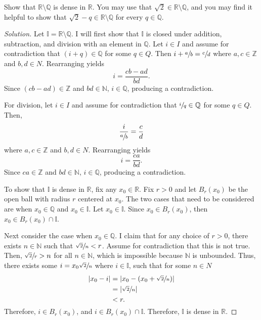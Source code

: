 \documentclass[11pt,letterpaper]{article}
\newcommand{\N}{\mathbb{N}}
\newcommand{\Q}{\mathbb{Q}}
\newcommand{\R}{\mathbb{R}}
\newcommand{\Z}{\mathbb{Z}}
\newcommand{\I}{\mathbb{I}}
\newenvironment{prob}[1]
  {\renewcommand\theinnerprob{#1}\innerprob}
  {\endinnerprob}
\newenvironment{solution}
  {\renewcommand\qedsymbol{}\begin{proof}[Solution]}
  {\end{proof}\bigskip}
\begin{document}
\begin{prob}{6} %
Show that $\R\setminus \Q$ is dense in $\R$.  You may use that $\sqrt 2 \in \R\setminus \Q$, and you may find it helpful to show that $\sqrt 2 -q \in \R\setminus \Q$ for every $q\in\Q$.
\end{prob}
\begin{solution}
	Let $\I = \R\setminus \Q$. I will first show that $\I$ is closed under addition, subtraction, and division with an element in $\Q$. Let $i\in I$ and assume for contradiction that $(i + q)\in \Q$ for some $q\in Q$. Then $i + \sfrac{a}{b} = \sfrac{c}{d}$ where $a,c\in \Z$ and $b,d \in N$. Rearranging yields $$ i = \frac{cb - ad}{bd}.$$ Since $(cb - ad) \in \Z$ and $bd\in \N$, $i\in \Q$, producing a contradiction. 
	
	For division, let $i\in I$ and assume for contradiction that $\sfrac{i}{q}\in \Q$ for some $q\in Q$. Then, $$\frac{i}{\sfrac{a}{b}} = \frac{c}{d}$$ where $a,c\in \Z$ and $b,d \in N$. Rearranging yields $$ i = \frac{ca}{bd}.$$ Since $ca \in \Z$ and $bd\in \N$, $i\in \Q$, producing a contradiction.
	
	To show that $\I$ is dense in $\R$, fix any $x_0\in \R$. Fix $r>0$ and let $B_r(x_0)$ be the open ball with radius $r$ centered at $x_0$. The two cases that need to be considered are when $x_0 \in \Q$ and $x_0 \in \I$. Let $x_0 \in \I$. Since $x_0 \in B_r(x_0)$, then $x_0 \in B_r(x_0) \cap \I$.
	
	Next consider the case when $x_0 \in \Q$. I claim that for any choice of $r>0$, there exists $n\in \N$ such that $\sfrac{\sqrt{2}}{n} < r$. Assume for contradiction that this is not true. Then, $\sfrac{\sqrt{2}}{r} > n$ for all $n\in \N$, which is impossible because $\N$ is unbounded. Thus, there exists some $i = x_0 \sfrac{\sqrt{2}}{n}$ where $i\in \I$, such that for some $n \in N$
	\[\begin{split}
		|x_0-i| & = |x_0-(x_0 + \sfrac{\sqrt{2}}{n})|\\
		& = |\sfrac{\sqrt{2}}{n}|\\
		& < r.
	\end{split}\]
	Therefore, $i\in B_r(x_0)$, and $i \in B_r(x_0) \cap \I$. Therefore, $\I$ is dense in $\R$. 
	
\end{solution}
\end{document}
